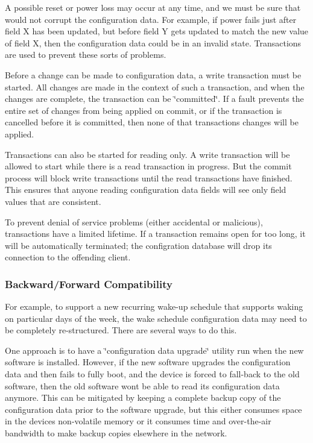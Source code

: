 A possible reset or power loss may occur at any time, and we must be sure that would not corrupt the configuration data. For example, if power fails just after field X has been updated, but before field Y gets updated to match the new value of field X, then the configuration data could be in an invalid state. Transactions are used to prevent these sorts of problems.

Before a change can be made to configuration data, a write transaction must be started. All changes are made in the context of such a transaction, and when the changes are complete, the transaction can be \char`\"{}committed\char`\"{}. If a fault prevents the entire set of changes from being applied on commit, or if the transaction is cancelled before it is committed, then none of that transaction\textquotesingle{}s changes will be applied.

Transactions can also be started for reading only. A write transaction will be allowed to start while there is a read transaction in progress. But the commit process will block write transactions until the read transactions have finished. This ensures that anyone reading configuration data fields will see only field values that are consistent.

To prevent denial of service problems (either accidental or malicious), transactions have a limited lifetime. If a transaction remains open for too long, it will be automatically terminated; the configration database will drop its connection to the offending client.\hypertarget{basic_config_backForwardCompatibility}{}\subsubsection{Backward/\+Forward Compatibility}\label{basic_config_backForwardCompatibility}
For example, to support a new recurring wake-\/up schedule that supports waking on particular days of the week, the wake schedule configuration data may need to be completely re-\/structured. There are several ways to do this.

One approach is to have a \char`\"{}configuration data upgrade\char`\"{} utility run when the new software is installed. However, if the new software upgrades the configuration data and then fails to fully boot, and the device is forced to fall-\/back to the old software, then the old software won\textquotesingle{}t be able to read its configuration data anymore. This can be mitigated by keeping a complete backup copy of the configuration data prior to the software upgrade, but this either consumes space in the device\textquotesingle{}s non-\/volatile memory or it consumes time and over-\/the-\/air bandwidth to make backup copies elsewhere in the network.

